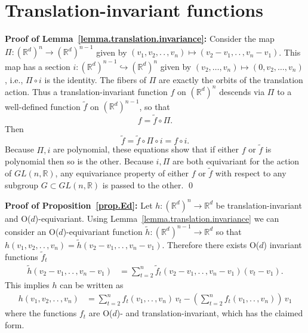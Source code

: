 \documentclass{article}
\renewcommand{\paragraph}[1]{\par\textbf{#1}}
\theoremstyle{Hogg}
\renewcommand{\ldots}{.\,.\,}
\begin{document}
\section{Translation-invariant functions}\label{app.translation}

\paragraph{Proof of Lemma~\ref{lemma.translation.invariance}:} Consider the map $\Pi:(\mathbb R^d)^n \rightarrow (\mathbb R^d)^{n-1}$ given by $(v_1,v_2,\ldots,v_n)\mapsto (v_2-v_1,\ldots,v_n-v_1)$. This map has a section $i:(\mathbb R^d)^{n-1}\hookrightarrow (\mathbb R^d)^n$ given by $(v_2,\dots,v_n)\mapsto (0,v_2,\dots,v_n)$, i.e., $\Pi\circ i$ is the identity. The fibers of $\Pi$ are exactly the orbits of the translation action. Thus a translation-invariant function $f$ on $(\mathbb R^d)^n$ descends via $\Pi$ to a well-defined function $\tilde f$ on $(\mathbb R^d)^{n-1}$, so that 
\begin{equation}
f = \tilde f \circ \Pi.
\end{equation}
Then 
\begin{equation}
\tilde f = \tilde f \circ \Pi \circ i = f\circ i.
\end{equation}
Because $\Pi,i$ are polynomial, these equations show that if either $f$ or $\tilde f$ is polynomial then so is the other. Because $i,\Pi$ are both equivariant for the action of $GL(n,\mathbb R)$, any equivariance property of either $f$ or $\tilde f$ with respect to any subgroup $G\subset GL(n,\mathbb R)$ is passed to the other.
\qed

\paragraph{Proof of Proposition~\ref{prop.Ed}:}
Let $h:(\mathbb R^d)^n \rightarrow \mathbb R^d$ be translation-invariant and O($d$)-equivariant. Using Lemma~\ref{lemma.translation.invariance} we can consider an O($d$)-equivariant function $\tilde h:(\mathbb R^d)^{n-1}\to \mathbb R^d$ so that $h(v_1,v_2, \ldots, v_n)=\tilde h(v_2-v_1, \ldots, v_n-v_1)$. Therefore there exists  O($d$) invariant functions $\tilde f_t$
\begin{align}
    \tilde h(v_2-v_1, \ldots, v_n-v_1) &= \textstyle \sum_{t=2}^n \tilde f_t(v_2-v_1, \ldots, v_n-v_1)(v_t-v_1). 
    \end{align}
This implies $h$ can be written as 
   \begin{align} 
   h(v_1,v_2, \ldots, v_n)
&=\textstyle\sum_{t=2}^n f_t(v_1,\ldots, v_n)\,v_t -(\textstyle\sum_{t=2}^n f_t(v_1,\ldots, v_n))\,v_1
\end{align}
where the functions $f_t$ are O($d$)- and translation-invariant, which has the claimed form. 
\end{document}
